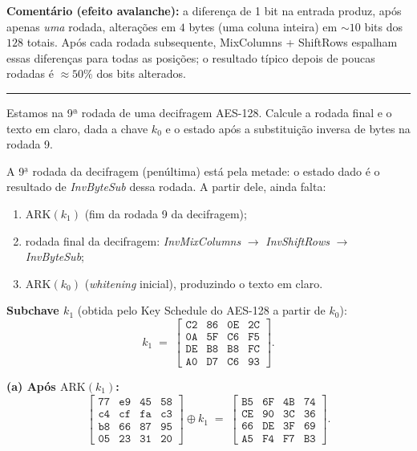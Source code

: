 \documentclass[12pt,a4paper]{article}
\newcommand{\exercicio}[1]{%
    \par\vspace{1.2em}
    \noindent
    {\color{black!55}\rule[-0.25em]{3pt}{1.6em}}%
    \hspace{0.6em}{\Large\bfseries Exerc\'{i}cio #1}
    \par\vspace{-0.4em}
    \noindent{\color{black!35}\rule{\textwidth}{0.4pt}}
    \par\vspace{0.35em}
}
\newenvironment{resposta}{%
    \begin{respostabox}
    \color{red!70!black}\sloppy
}{%
    \end{respostabox}
}
\begin{document}
\begin{resposta}
\textbf{Comentário (efeito avalanche):} a diferença de 1 bit na entrada produz, após apenas \emph{uma} rodada, alterações em $4$ bytes (uma coluna inteira) em $\sim 10$ bits dos $128$ totais. Após cada rodada subsequente, MixColumns + ShiftRows espalham essas diferenças para todas as posições; o resultado típico depois de poucas rodadas é $\approx 50\%$ dos bits alterados.

\end{resposta}

\exercicio{8}
Estamos na 9ª rodada de uma decifragem AES-128. Calcule a rodada final e o texto em claro, dada a chave $k_0$ e o estado após a substituição inversa de bytes na rodada 9.

\begin{resposta}

A 9$^{\underline{\text{a}}}$ rodada da decifragem (penúltima) está pela metade: o estado dado é o resultado de \emph{InvByteSub} dessa rodada. A partir dele, ainda falta:
\begin{enumerate}[label=(\alph*)]
\item $\mathrm{ARK}(k_1)$ (fim da rodada 9 da decifragem);
\item rodada final da decifragem: \emph{InvMixColumns} $\to$ \emph{InvShiftRows} $\to$ \emph{InvByteSub};
\item $\mathrm{ARK}(k_0)$ (\emph{whitening} inicial), produzindo o texto em claro.
\end{enumerate}

\textbf{Subchave $k_1$} (obtida pelo Key Schedule do AES-128 a partir de $k_0$):
\[
k_1 \;=\; \begin{bmatrix}\texttt{C2}&\texttt{86}&\texttt{0E}&\texttt{2C}\\\texttt{0A}&\texttt{5F}&\texttt{C6}&\texttt{F5}\\\texttt{DE}&\texttt{B8}&\texttt{B8}&\texttt{FC}\\\texttt{A0}&\texttt{D7}&\texttt{C6}&\texttt{93}\end{bmatrix}.
\]

\textbf{(a) Após $\mathrm{ARK}(k_1)$:}
\[
\begin{bmatrix}\texttt{77}&\texttt{e9}&\texttt{45}&\texttt{58}\\\texttt{c4}&\texttt{cf}&\texttt{fa}&\texttt{c3}\\\texttt{b8}&\texttt{66}&\texttt{87}&\texttt{95}\\\texttt{05}&\texttt{23}&\texttt{31}&\texttt{20}\end{bmatrix}
\oplus k_1
\;=\;
\begin{bmatrix}\texttt{B5}&\texttt{6F}&\texttt{4B}&\texttt{74}\\\texttt{CE}&\texttt{90}&\texttt{3C}&\texttt{36}\\\texttt{66}&\texttt{DE}&\texttt{3F}&\texttt{69}\\\texttt{A5}&\texttt{F4}&\texttt{F7}&\texttt{B3}\end{bmatrix}.
\]


\end{resposta}
\end{document}
